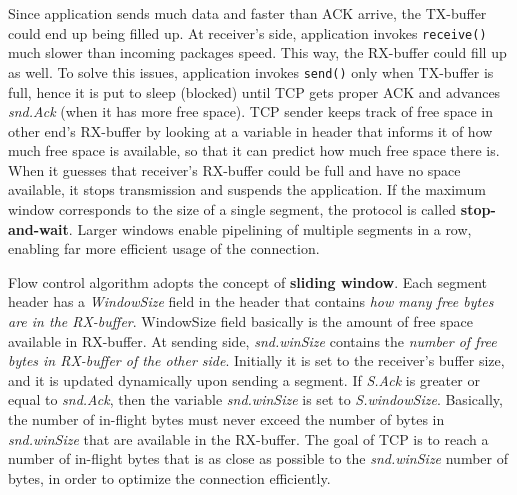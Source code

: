 \documentclass[10pt]{book}
\begin{document}
Since application sends much data and faster than ACK arrive, the TX-buffer
could end up being filled up. At receiver's side, application invokes
\texttt{receive()} much slower than incoming packages speed. This way, the
RX-buffer could fill up as well. To solve this issues, application invokes
\texttt{send()} only when TX-buffer is full, hence it is put to sleep (blocked)
until TCP gets proper ACK and advances \emph{snd.Ack} (when it has more free
space). TCP sender keeps track of free space in other end's RX-buffer by
looking at a variable in header that informs it of how much free space is
available, so that it can predict how much free space there is. When it guesses
that receiver's RX-buffer could be full and have no space available, it stops
transmission and suspends the application. If the maximum window corresponds to
the size of a single segment, the protocol is called \textbf{stop-and-wait}.
Larger windows enable pipelining of multiple segments in a row, enabling far
more efficient usage of the connection.

Flow control algorithm adopts the concept of \textbf{sliding window}. Each
segment header has a \emph{WindowSize} field in the header that contains
\emph{how many free bytes are in the RX-buffer}. WindowSize field basically is
the amount of free space available in RX-buffer. At sending side,
\emph{snd.winSize} contains the \emph{number of free bytes in RX-buffer of
the other side}. Initially it is set to the receiver's buffer size, and it is
updated dynamically upon sending a segment. If \emph{S.Ack} is greater or
equal to \emph{snd.Ack}, then the variable \emph{snd.winSize} is set to
\emph{S.windowSize}. Basically, the number of in-flight bytes must never
exceed the number of bytes in \emph{snd.winSize} that are available in the
RX-buffer. The goal of TCP is to reach a number of in-flight bytes that is as
close as possible to the \emph{snd.winSize} number of bytes, in order to
optimize the connection efficiently.
\end{document}
